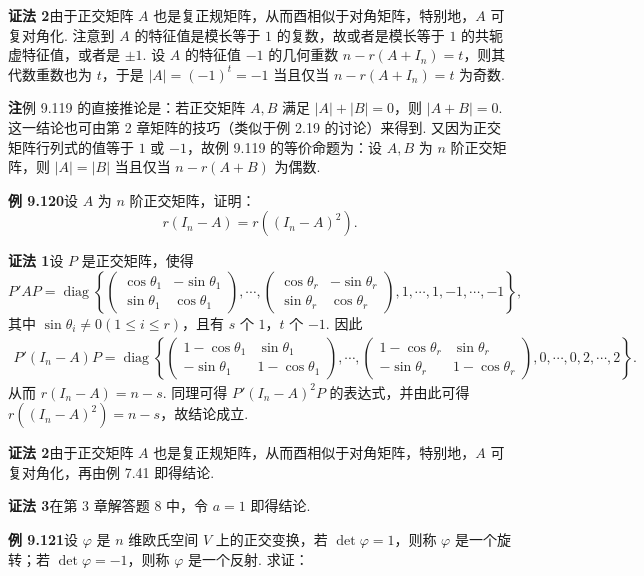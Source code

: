 \documentclass[UTF8,12pt,a4paper,fontset=fandol]{ctexart}
\begin{document}
\noindent\textbf{证法 2}\quad 由于正交矩阵 $A$ 也是复正规矩阵，从而酉相似于对角矩阵，特别地，$A$ 可复对角化. 注意到 $A$ 的特征值是模长等于 $1$ 的复数，故或者是模长等于 $1$ 的共轭虚特征值，或者是 $\pm1$. 设 $A$ 的特征值 $-1$ 的几何重数 $n-r(A+I_n)=t$，则其代数重数也为 $t$，于是 $|A|=(-1)^t=-1$ 当且仅当 $n-r(A+I_n)=t$ 为奇数.

\noindent\textbf{注}\quad 例 9.119 的直接推论是：若正交矩阵 $A,B$ 满足 $|A|+|B|=0$，则 $|A+B|=0$. 这一结论也可由第 2 章矩阵的技巧（类似于例 2.19 的讨论）来得到. 又因为正交矩阵行列式的值等于 $1$ 或 $-1$，故例 9.119 的等价命题为：设 $A,B$ 为 $n$ 阶正交矩阵，则 $|A|=|B|$ 当且仅当 $n-r(A+B)$ 为偶数.

\noindent\textbf{例 9.120}\quad 设 $A$ 为 $n$ 阶正交矩阵，证明：
\[
r(I_n-A)=r((I_n-A)^2).
\]

\noindent\textbf{证法 1}\quad 设 $P$ 是正交矩阵，使得
\[
P'AP=\operatorname{diag}\left\{
\begin{pmatrix}
\cos\theta_1&-\sin\theta_1\\
\sin\theta_1&\cos\theta_1
\end{pmatrix},\cdots,
\begin{pmatrix}
\cos\theta_r&-\sin\theta_r\\
\sin\theta_r&\cos\theta_r
\end{pmatrix},
1,\cdots,1,-1,\cdots,-1
\right\},
\]
其中 $\sin\theta_i\ne0(1\le i\le r)$，且有 $s$ 个 $1$，$t$ 个 $-1$. 因此
\[
\begin{aligned}
P'(I_n-A)P
=\operatorname{diag}\left\{
\begin{pmatrix}
1-\cos\theta_1&\sin\theta_1\\
-\sin\theta_1&1-\cos\theta_1
\end{pmatrix},\cdots,
\begin{pmatrix}
1-\cos\theta_r&\sin\theta_r\\
-\sin\theta_r&1-\cos\theta_r
\end{pmatrix},
0,\cdots,0,2,\cdots,2
\right\}.
\end{aligned}
\]
从而 $r(I_n-A)=n-s$. 同理可得 $P'(I_n-A)^2P$ 的表达式，并由此可得 $r((I_n-A)^2)=n-s$，故结论成立.

\noindent\textbf{证法 2}\quad 由于正交矩阵 $A$ 也是复正规矩阵，从而酉相似于对角矩阵，特别地，$A$ 可复对角化，再由例 7.41 即得结论.

\noindent\textbf{证法 3}\quad 在第 3 章解答题 8 中，令 $a=1$ 即得结论.

\noindent\textbf{例 9.121}\quad 设 $\varphi$ 是 $n$ 维欧氏空间 $V$ 上的正交变换，若 $\det\varphi=1$，则称 $\varphi$ 是一个旋转；若 $\det\varphi=-1$，则称 $\varphi$ 是一个反射. 求证：
\end{document}
